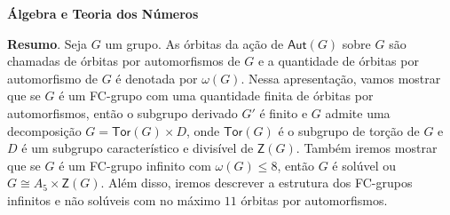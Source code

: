 
\pagestyle{fancy}

\lhead{}
\rhead{}


\renewcommand{\headrulewidth}{0.4pt}
\renewcommand{\footrulewidth}{0.4pt}


\begin{center}
	\huge{{\bf \'{A}lgebra e Teoria dos N\'{u}meros}}
	\vspace{1cm}
\end{center}




	\noindent\textbf{Resumo}. \label{acd} Seja $G$ um grupo. As órbitas da ação de $\mathsf{Aut}(G)$ sobre $G$ são chamadas de órbitas por automorfismos de $G$ e a quantidade de órbitas por automorfismo de $G$ é denotada por $\omega(G)$. Nessa apresentação, vamos mostrar que se $G$ é um FC-grupo com uma quantidade finita de órbitas por automorfismos, então o subgrupo derivado $G'$ é finito e $G$ admite uma decomposição $G = \mathsf{Tor}(G) \times D$, onde $\mathsf{Tor}(G)$ é o subgrupo de torção de $G$ e $D$ é um subgrupo característico e divisível de $\mathsf{Z}(G)$. Também iremos mostrar que se $G$ é um FC-grupo infinito com $\omega(G) \leqslant 8$, então $G$ é solúvel ou $G \cong A_5 \times \mathsf{Z}(G)$. Além disso, iremos descrever a estrutura dos FC-grupos infinitos e não solúveis com no máximo $11$ órbitas por automorfismos. 

